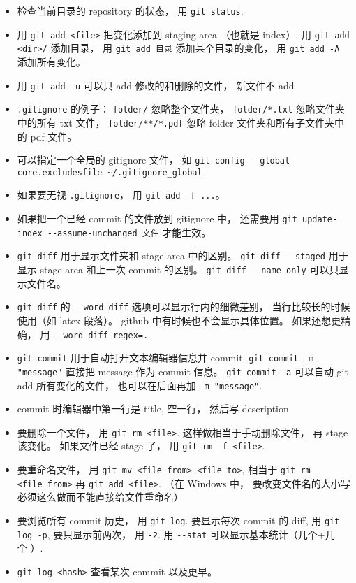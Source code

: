 \begin{itemize}
\item 检查当前目录的 repository 的状态， 用 \verb|git status|. 
\item 用 \verb|git add <file>| 把变化添加到 staging area （也就是 index）. 用 \verb|git add <dir>/| 添加目录， 用 \verb|git add 目录| 添加某个目录的变化， 用 \verb|git add -A| 添加所有变化。
\item 用 \verb|git add -u| 可以只 add 修改的和删除的文件， 新文件不 add
\item \verb|.gitignore| 的例子： \verb|folder/| 忽略整个文件夹， \verb|folder/*.txt| 忽略文件夹中的所有 txt 文件， \verb|folder/**/*.pdf| 忽略 folder 文件夹和所有子文件夹中的 pdf 文件。
\item 可以指定一个全局的 gitignore 文件， 如 \verb|git config --global core.excludesfile ~/.gitignore_global|
\item 如果要无视 \verb|.gitignore|， 用 \verb|git add -f ...|。
\item 如果把一个已经 commit 的文件放到 gitignore 中， 还需要用 \verb|git update-index --assume-unchanged 文件| 才能生效。
\item \verb|git diff| 用于显示文件夹和 stage area 中的区别。 \verb|git diff --staged| 用于显示 stage area 和上一次 commit 的区别。 \verb|git diff --name-only| 可以只显示文件名。
\item \verb|git diff| 的 \verb|--word-diff| 选项可以显示行内的细微差别， 当行比较长的时候使用（如 latex 段落）。 github 中有时候也不会显示具体位置。 如果还想更精确， 用 \verb|--word-diff-regex=.|
\item \verb|git commit| 用于自动打开文本编辑器信息并 commit. \verb|git commit -m "message"| 直接把 message 作为 commit 信息。 \verb|git commit -a| 可以自动 git add 所有变化的文件， 也可以在后面再加 \verb|-m "message"|.
\item commit 时编辑器中第一行是 title, 空一行， 然后写 description
\item 要删除一个文件， 用 \verb|git rm <file>|. 这样做相当于手动删除文件， 再 stage 该变化。 如果文件已经 stage 了， 用 \verb|git rm -f <file>|.
\item 要重命名文件， 用 \verb|git mv <file_from> <file_to>|, 相当于 \verb|git rm <file_from>| 再 \verb|git add <file>|. （在 Windows 中， 要改变文件名的大小写必须这么做而不能直接给文件重命名）
\item 要浏览所有 commit 历史， 用 \verb|git log|. 要显示每次 commit 的 diff, 用 \verb|git log -p|, 要只显示前两次， 用 \verb|-2|. 用 \verb|--stat| 可以显示基本统计（几个+几个-）.
\item \verb|git log <hash>| 查看某次 commit 以及更早。

\end{itemize}
